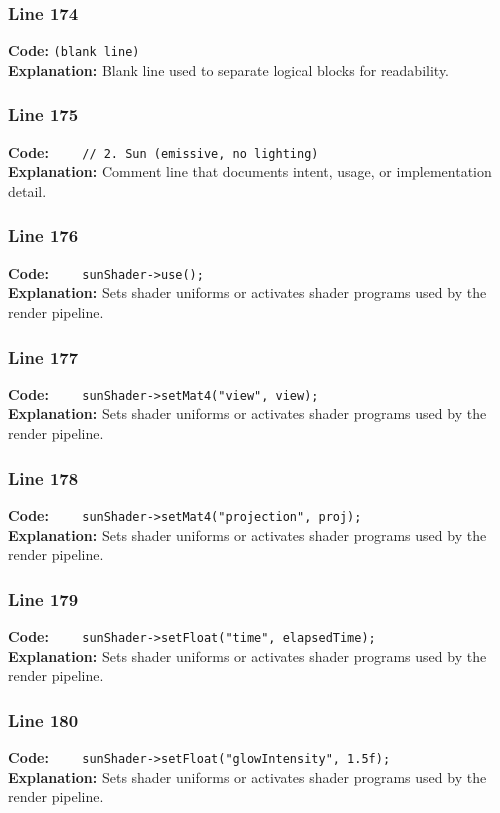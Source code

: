 \documentclass[11pt,a4paper]{article}
\begin{document}
\subsubsection*{Line 174}
\textbf{Code:} \texttt{(blank line)}\\
\textbf{Explanation:} Blank line used to separate logical blocks for readability.

\subsubsection*{Line 175}
\textbf{Code:} \verb|    // 2. Sun (emissive, no lighting)|\\
\textbf{Explanation:} Comment line that documents intent, usage, or implementation detail.

\subsubsection*{Line 176}
\textbf{Code:} \verb|    sunShader->use();|\\
\textbf{Explanation:} Sets shader uniforms or activates shader programs used by the render pipeline.

\subsubsection*{Line 177}
\textbf{Code:} \verb|    sunShader->setMat4("view", view);|\\
\textbf{Explanation:} Sets shader uniforms or activates shader programs used by the render pipeline.

\subsubsection*{Line 178}
\textbf{Code:} \verb|    sunShader->setMat4("projection", proj);|\\
\textbf{Explanation:} Sets shader uniforms or activates shader programs used by the render pipeline.

\subsubsection*{Line 179}
\textbf{Code:} \verb|    sunShader->setFloat("time", elapsedTime);|\\
\textbf{Explanation:} Sets shader uniforms or activates shader programs used by the render pipeline.

\subsubsection*{Line 180}
\textbf{Code:} \verb|    sunShader->setFloat("glowIntensity", 1.5f);|\\
\textbf{Explanation:} Sets shader uniforms or activates shader programs used by the render pipeline.
\end{document}
